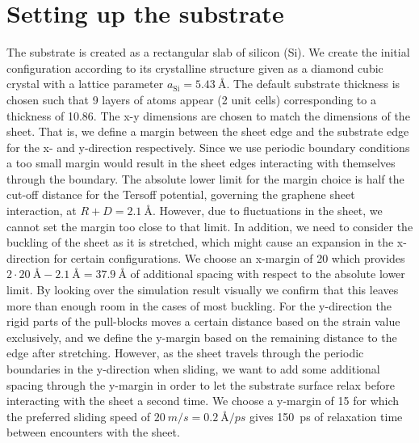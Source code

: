 \section{Setting up the substrate}\label{sec:substrate}
The substrate is created as a rectangular slab of silicon (Si). We create the
initial configuration according to its crystalline structure given as a diamond
cubic crystal with a lattice parameter $a_{\text{Si}} = \SI{5.43}{\text{Å}}$.
The default substrate thickness is chosen such that 9 layers of atoms appear (2
unit cells) corresponding to a thickness of \SI{10.86}{}. The x-y
dimensions are chosen to match the dimensions of the sheet. That is, we define a
margin between the sheet edge and the substrate edge for the x- and y-direction
respectively. Since we use periodic boundary conditions a too small margin would
result in the sheet edges interacting with themselves through the boundary. The
absolute lower limit for the margin choice is half the cut-off distance for
the Tersoff potential, governing the graphene sheet interaction, at $R + D =
\SI{2.1}{\text{Å}}$. However, due to fluctuations in the sheet, we cannot set the margin too
close to that limit. In addition, we need to consider the buckling of the sheet as it is stretched, which might cause an expansion in the x-direction for certain configurations. We choose an x-margin of \SI{20}{} which provides $2\cdot
\SI{20}{\text{Å}} - \SI{2.1}{\text{Å}} = \SI{37.9}{\text{Å}}$ of additional
spacing with respect to the absolute lower limit. By looking over the simulation
result visually we confirm that this leaves more than enough room in the cases
of most buckling. For the y-direction the rigid parts of the pull-blocks
moves a certain distance based on the strain value exclusively, and we define
the y-margin based on the remaining distance to the edge after stretching.
However, as the sheet travels through the periodic boundaries in the y-direction
when sliding, we want to add some additional spacing through the y-margin in
order to let the substrate surface relax before interacting with the sheet a
second time. We choose a y-margin of \SI{15}{} for which the preferred sliding speed
of $\SI{20}{m/s} = \SI{0.2}{\text{Å}/ps}$ gives \SI{150}{ps} of relaxation time
between encounters with the sheet. 


